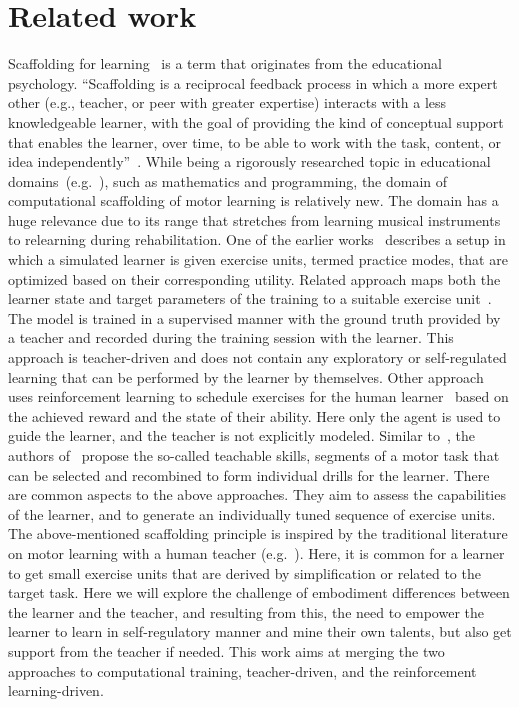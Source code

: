 \documentclass{article}
\begin{document}
\section{Related work}

Scaffolding for learning~\cite{encyclopedia} is a term that originates from the educational psychology. “Scaffolding is a reciprocal feedback process in which a more expert other (e.g.,
teacher, or peer with greater expertise) interacts with a less knowledgeable learner, with the goal of
providing the kind of conceptual support that enables the learner, over time, to be able to work with
the task, content, or idea independently”~\cite{encyclopedia}. While being a  rigorously researched topic in educational domains~(e.g.~\cite{brunskill23,passen21,amy}), such as mathematics and programming, the domain of computational scaffolding of motor learning is relatively new.  The domain has a huge relevance due to its range that stretches from learning musical instruments to relearning during rehabilitation.
One of the earlier works~\cite{soeren} describes a setup in which a simulated learner is given exercise units, termed practice modes, that are optimized based on their corresponding utility. 
  Related  approach maps both the learner state and  target parameters of the training to a suitable exercise unit~\cite{gauss}. The model is trained in a supervised manner  with the ground truth provided by a  teacher and recorded during the training session with the learner.   This approach is teacher-driven and does not contain any exploratory or self-regulated learning that can be performed by the learner by themselves. 
Other approach uses reinforcement learning to schedule exercises  for the human learner~\cite{nature} based on the achieved reward and the state of their ability.  Here only the agent is used to guide the learner, and the teacher is not explicitly modeled.  Similar to~\cite{soeren}, the authors of~\cite{megha} propose the so-called teachable skills, segments of a motor task that can be selected and  recombined to form individual drills for the learner. There are common aspects to the above approaches. They aim to assess the capabilities of the learner, and to generate an individually tuned sequence of exercise units. 
The above-mentioned scaffolding principle is inspired by the traditional literature on motor learning with a human teacher (e.g.~\cite{cortot}). Here, it is common for a learner to get small exercise units that are derived by simplification or related to the target task. Here we will explore the challenge of embodiment differences between the learner  and the teacher, and resulting from this, the need to empower the learner to learn in self-regulatory manner and mine their own talents, but also get support from the teacher if needed.    
This work aims at merging the two approaches to computational training, teacher-driven, and the reinforcement learning-driven. 
\end{document}
